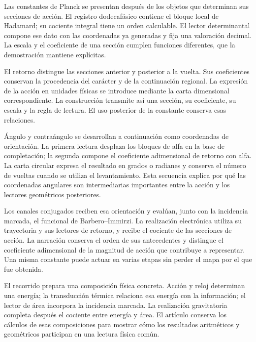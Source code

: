 
Las constantes de Planck se presentan después de los objetos que
determinan sus secciones de acción. El registro dodecafásico contiene el
bloque local de Hadamard; su cociente integral tiene un orden calculable.
El lector determinantal compone ese dato con las coordenadas ya generadas
y fija una valoración decimal. La escala y el coeficiente de una sección
cumplen funciones diferentes, que la demostración mantiene explícitas.

El retorno distingue las secciones anterior y posterior a la vuelta.
Sus coeficientes conservan la procedencia del carácter y de la
continuación regional. La expresión de la acción en unidades físicas
se introduce mediante la carta dimensional correspondiente. La
construcción transmite así una sección, su coeficiente, su escala y la
regla de lectura. El uso posterior de la constante conserva esas
relaciones.

Ángulo y contraángulo se desarrollan a continuación como coordenadas de
orientación. La primera lectura desplaza los bloques de alfa en la base
de completación; la segunda compone el coeficiente adimensional de
retorno con alfa. La carta circular expresa el resultado en grados o
radianes y conserva el número de vueltas cuando se utiliza el
levantamiento. Esta secuencia explica por qué las coordenadas angulares
son intermediarias importantes entre la acción y los lectores
geométricos posteriores.

Los canales conjugados reciben esa orientación y evalúan, junto con
la incidencia marcada, el funcional de Barbero--Immirzi.
La realización electrónica utiliza su trayectoria y sus lectores de
retorno, y recibe el cociente de las secciones de acción. La narración conserva
el orden de sus antecedentes y distingue el coeficiente adimensional
de la magnitud de acción que contribuye a representar. Una misma
constante puede actuar en varias etapas sin perder el mapa por el que
fue obtenida.

El recorrido prepara una composición física concreta. Acción y reloj
determinan una energía; la transducción térmica relaciona esa energía
con la información; el lector de área incorpora la incidencia marcada.
La realización gravitatoria completa después el cociente entre energía
y área. El artículo conserva los cálculos de esas composiciones para
mostrar cómo los resultados aritméticos y geométricos participan en
una lectura física común.

